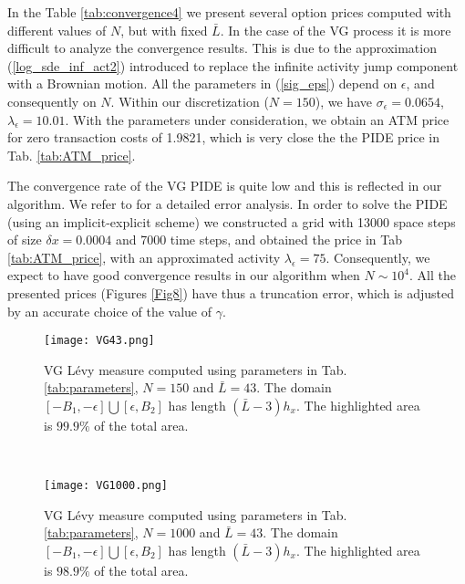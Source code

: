 In the Table \ref{tab:convergence4} we present several option prices computed with different values of $N$, but with fixed $\bar L$.
In the case of the VG process it is more difficult to analyze the convergence results.
This is due to the approximation (\ref{log_sde_inf_act2}) introduced to replace the infinite activity jump component with a Brownian motion. All the parameters
in (\ref{sig_eps}) depend on $\epsilon$, and consequently on $N$.
Within our discretization ($N=150$), we have $\sigma_{\epsilon} = 0.0654$, $\lambda_{\epsilon} = 10.01$. 
With the parameters under consideration, we obtain an ATM price for zero transaction costs of 1.9821, which is very close the the PIDE price in Tab. \ref{tab:ATM_price}. 

The convergence rate of the VG PIDE is quite low and this is reflected in our algorithm. We refer to \cite{CoVo05b} for a detailed error analysis.
In order to solve the PIDE (using an implicit-explicit scheme) we constructed
a grid with 13000 space steps of size $\delta x = 0.0004$ and 7000 time steps, and obtained the price in Tab \ref{tab:ATM_price}, 
with an approximated activity $\lambda_{\epsilon} = 75$.
Consequently, we expect to have good convergence results in our algorithm when $N\sim 10^4$.
All the presented prices (Figures \ref{Fig8}) have thus a truncation error, which is adjusted by an accurate choice of the value of $\gamma$. 

\begin{figure}[t!]
 \begin{minipage}[b]{0.5\linewidth}
   \centering
   \texttt{[image: VG43.png]}
   \caption{VG L\'evy measure computed using parameters in Tab. \ref{tab:parameters}, $N=150$ and $\bar L=43$. 
   The domain $[-B_1,-\epsilon]\bigcup [\epsilon,B_2]$ has length $(\bar L-3) h_x$. The highlighted area is $99.9\%$ of the total area.}
   \label{Fig15} 
 \end{minipage}
 \ \hspace{2mm} \hspace{3mm} \
 \begin{minipage}[b]{0.5\linewidth}
  \centering
   \texttt{[image: VG1000.png]}
   \caption{VG L\'evy measure computed using parameters in Tab. \ref{tab:parameters}, $N=1000$ and $\bar L=43$. 
   The domain $[-B_1,-\epsilon]\bigcup [\epsilon,B_2]$ has length $(\bar L-3) h_x$. The highlighted area is $98.9\%$ of the total area.}
   \label{Fig16}
 \end{minipage}
\end{figure}


